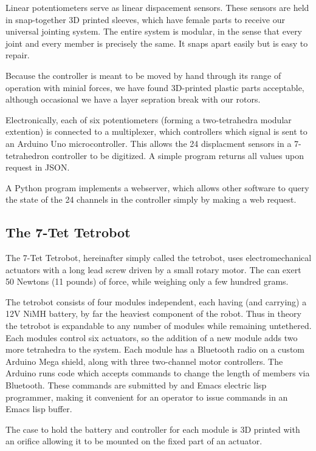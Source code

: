 \documentclass[conference]{article}
\begin{document}
 Linear potentiometers serve as linear dispacement sensors.
 These sensors are held in snap-together 3D printed sleeves, which have
 female parts to receive our universal jointing system. The entire
 system is modular, in the sense that every joint and
 every member is precisely the same.
 It snaps apart easily but is easy to repair.

 Because the controller is meant to be moved by hand through its range of
 operation with minial forces, we have found 3D-printed plastic parts acceptable,
 although occasional we have a layer sepration break with our rotors.

 Electronically, each of six potentiometers (forming a two-tetrahedra
 modular extention) is connected to a multiplexer, which controllers
 which signal is sent to an Arduino Uno microcontroller. This allows
 the 24 displacment sensors in a 7-tetrahedron controller to be
 digitized. A simple program returns all values upon request in
 JSON.

 A Python program implements a webserver, which allows other software
 to query the state of the 24 channels in the controller simply by
 making a web request.

 \subsection{The 7-Tet Tetrobot}

The 7-Tet Tetrobot, hereinafter simply called the tetrobot,
uses electromechanical actuators with a long lead screw driven by a small
rotary motor. The can exert 50 Newtons (11 pounds) of force, while weighing only a few hundred grams.

The tetrobot consists of four modules independent, each having (and carrying) a 12V NiMH battery, by far
the heaviest component of the robot. Thus in theory the tetrobot is expandable to any number of modules
while remaining untethered. Each modules control six actuators, so the addition of a new module adds
two more tetrahedra to the system. Each module has a Bluetooth radio on a custom Arduino Mega shield,
along with three two-channel motor controllers. The Arduino runs code which accepts commands to change
the length of members via Bluetooth. These commands are submitted by and Emacs electric lisp programmer,
making it convenient for an operator to issue commands in an Emacs lisp buffer.

The case to hold the battery and controller for each module is 3D printed with an orifice allowing
it to be mounted on the fixed part of an actuator.
\end{document}

